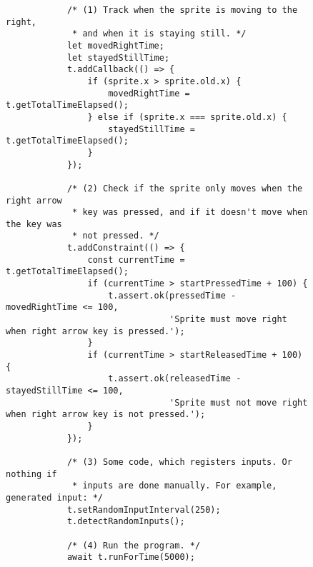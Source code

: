 \begin{listing}[htpb]
\begin{subfigure}[b]{.55\textwidth}
\begin{verbatim}
            /* (1) Track when the sprite is moving to the right,
             * and when it is staying still. */
            let movedRightTime;
            let stayedStillTime;
            t.addCallback(() => {
                if (sprite.x > sprite.old.x) {
                    movedRightTime = t.getTotalTimeElapsed();
                } else if (sprite.x === sprite.old.x) {
                    stayedStillTime = t.getTotalTimeElapsed();
                }
            });

            /* (2) Check if the sprite only moves when the right arrow
             * key was pressed, and if it doesn't move when the key was
             * not pressed. */
            t.addConstraint(() => {
                const currentTime = t.getTotalTimeElapsed();
                if (currentTime > startPressedTime + 100) {
                    t.assert.ok(pressedTime - movedRightTime <= 100,
                                'Sprite must move right when right arrow key is pressed.');
                }
                if (currentTime > startReleasedTime + 100) {
                    t.assert.ok(releasedTime - stayedStillTime <= 100,
                                'Sprite must not move right when right arrow key is not pressed.');
                }
            });

            /* (3) Some code, which registers inputs. Or nothing if
             * inputs are done manually. For example, generated input: */
            t.setRandomInputInterval(250);
            t.detectRandomInputs();

            /* (4) Run the program. */
            await t.runForTime(5000);


\end{verbatim}
\end{subfigure}
\end{listing}
